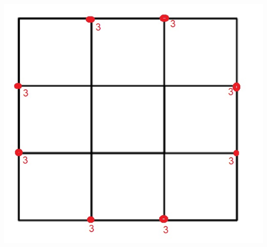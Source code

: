 \documentclass{article}
\begin{document}
{\includegraphics[scale=0.2]{img/img2.jpg}}
\end{document}
